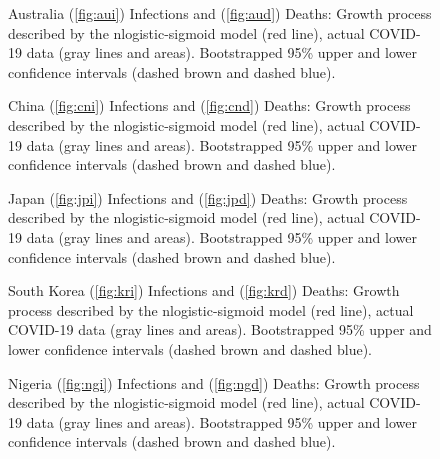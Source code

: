 \documentclass[journal]{IEEEtran}
\theoremstyle{plain}
\theoremstyle{definition}
\theoremstyle{remark}
\begin{document}
\begin{figure}[t]
	\centering
	\quad
	
	\caption{Australia (\ref{fig:aui}) Infections and (\ref{fig:aud}) Deaths: Growth process described by the nlogistic-sigmoid model (red line), actual COVID-19 data (gray lines and areas). Bootstrapped 95\% upper and lower confidence intervals (dashed brown and dashed blue).}
\end{figure}
\begin{figure}[t]
	\centering
	\quad
	
	\caption{China (\ref{fig:cni}) Infections and (\ref{fig:cnd}) Deaths: Growth process described by the nlogistic-sigmoid model (red line), actual COVID-19 data (gray lines and areas). Bootstrapped 95\% upper and lower confidence intervals (dashed brown and dashed blue).}
\end{figure}
\begin{figure}[t]
	\centering
	\quad
	
	\caption{Japan (\ref{fig:jpi}) Infections and (\ref{fig:jpd}) Deaths: Growth process described by the nlogistic-sigmoid model (red line), actual COVID-19 data (gray lines and areas). Bootstrapped 95\% upper and lower confidence intervals (dashed brown and dashed blue).}
\end{figure}
\begin{figure}[t]
	\centering
	\quad
	
	\caption{South Korea (\ref{fig:kri}) Infections and (\ref{fig:krd}) Deaths: Growth process described by the nlogistic-sigmoid model (red line), actual COVID-19 data (gray lines and areas). Bootstrapped 95\% upper and lower confidence intervals (dashed brown and dashed blue).}
\end{figure}
\begin{figure}[t]
	\centering
	\quad
	
	\caption{Nigeria (\ref{fig:ngi}) Infections and (\ref{fig:ngd}) Deaths: Growth process described by the nlogistic-sigmoid model (red line), actual COVID-19 data (gray lines and areas). Bootstrapped 95\% upper and lower confidence intervals (dashed brown and dashed blue).}
\end{figure}
\end{document}
